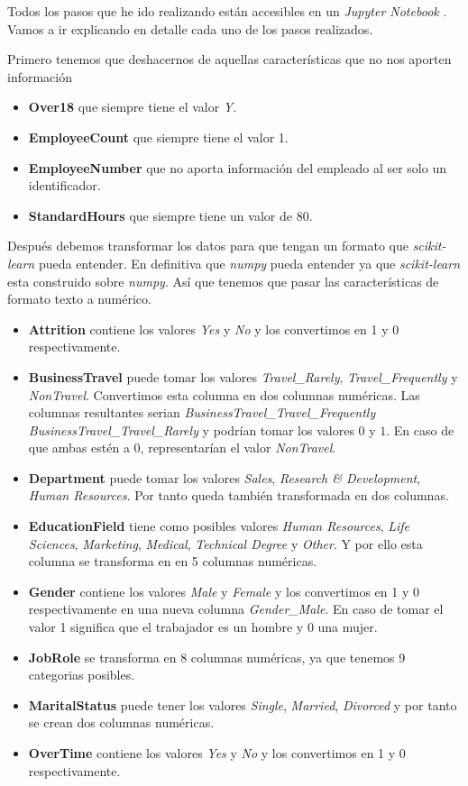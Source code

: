 Todos los pasos que he ido realizando están accesibles en un \textit{Jupyter Notebook} \cite{jupyter_notebook}. 
Vamos a ir explicando en detalle cada uno de los pasos realizados.



Primero tenemos que deshacernos de aquellas características que no nos aporten información
\begin{itemize}
	\item \textbf{Over18} que siempre tiene el valor \textit{Y}.
	\item \textbf{EmployeeCount} que siempre tiene el valor 1.
	\item \textbf{EmployeeNumber} que no aporta información del empleado al ser solo un identificador.
	\item \textbf{StandardHours} que siempre tiene un valor de 80.
\end{itemize}

Después debemos transformar los datos para que tengan un formato que \textit{scikit-learn} pueda entender. En definitiva que \textit{numpy} pueda entender ya que \textit{scikit-learn} esta construido sobre \textit{numpy}.
Así que tenemos que pasar las características de formato texto a numérico.

\begin{itemize}
	\item \textbf{Attrition} contiene los valores \textit{Yes} y \textit{No} y los convertimos en 1 y 0 respectivamente.
	\item \textbf{BusinessTravel} puede tomar los valores \textit{Travel\_Rarely}, \textit{Travel\_Frequently} y \textit{Non\-Travel}. 
	Convertimos esta columna en dos columnas numéricas.
	Las columnas resultantes serian \textit{BusinessTravel\_Travel\_Frequently} \textit{BusinessTravel\_Travel\_Rarely} y podrían tomar los valores $0$ y $1$.
	En caso de que ambas estén a $0$, representarían el valor \textit{Non\-Travel}.
	\item \textbf{Department} puede tomar los valores \textit{Sales}, \textit{Research \& Development}, \textit{Human Resources}. 
	Por tanto queda también transformada en dos columnas.
	\item \textbf{EducationField} tiene como posibles valores \textit{Human Resources}, \textit{Life Sciences}, \textit{Marketing}, \textit{Medical}, \textit{Technical Degree} y \textit{Other}. 
	Y por ello esta columna se transforma en en 5 columnas numéricas. 
	\item \textbf{Gender} contiene los valores \textit{Male} y \textit{Female} y los convertimos en 1 y 0 respectivamente en una nueva columna \textit{Gender\_Male}.
	En caso de tomar el valor 1 significa que el trabajador es un hombre y 0 una mujer.
	\item \textbf{JobRole} se transforma en 8 columnas numéricas, ya que tenemos 9 categorias posibles.
	\item \textbf{MaritalStatus} puede tener los valores \textit{Single}, \textit{Married}, \textit{Divorced} y por tanto se crean dos columnas numéricas.
	\item \textbf{OverTime} contiene los valores \textit{Yes} y \textit{No} y los convertimos en 1 y 0 respectivamente.
\end{itemize}

